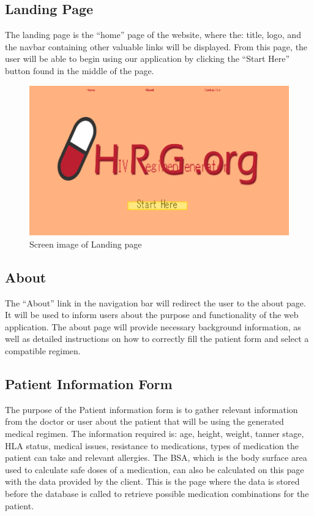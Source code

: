 \documentclass[12pt]{article}
\begin{document}
\subsection{Landing Page}
The landing page is the “home” page of the website, where the: title, logo, and the navbar containing other valuable links will be displayed. From this page, the user will be able to begin using our application by clicking the “Start Here” button found in the middle of the page.

\begin{figure}[!h]
  \centering
  \includegraphics[width=\linewidth]{landing.png}
  \caption{Screen image of Landing page}
  \label{fig:landing}
\end{figure}

\subsection{About}
The “About” link in the navigation bar will redirect the user to the about page. It will be used to inform users about the purpose and functionality of the web application. The about page will provide necessary background information, as well as detailed instructions on how to correctly fill the patient form and select a compatible regimen.

\subsection{Patient Information Form}
The purpose of the Patient information form is to gather relevant information from the doctor or user about the patient that will be using the generated medical regimen. The information required is: age, height, weight, tanner stage, HLA status, medical issues, resistance to medications, types of medication the patient can take and relevant allergies. The BSA, which is the body surface area used to calculate safe doses of a medication, can also be calculated on this page with the data provided by the client. This is the page where the data is stored before the database is called to retrieve possible medication combinations for the patient.
\end{document}
